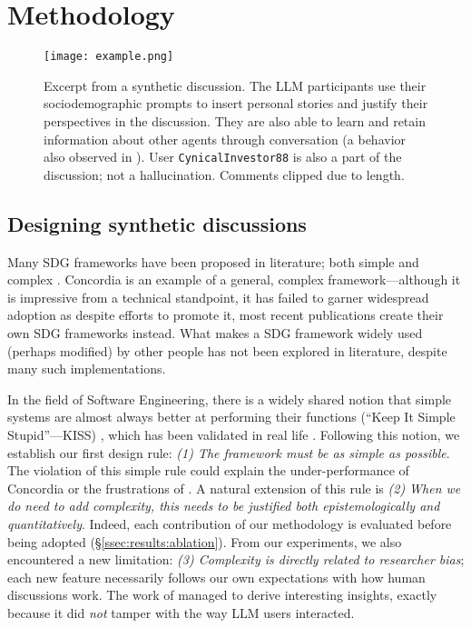 %

\section{Methodology}
\label{sec:methodology}

 \begin{figure*}[t]
	\centering
	\texttt{[image: example.png]}
	\caption{Excerpt from a synthetic discussion. The LLM participants use their sociodemographic prompts to insert personal stories and justify their perspectives in the discussion. They are also able to learn and retain information about other agents through conversation (a behavior also observed in \citet{park2023game}). User \texttt{CynicalInvestor88} is also a part of the discussion; not a hallucination. Comments clipped due to length.}
	\label{fig::example}
\end{figure*}


\subsection{Designing synthetic discussions}
\label{ssec:methodology:design}

Many SDG frameworks have been proposed in literature; both simple \citep{Tsai_Deliberate_Lab_Open-Source_2025, ulmer2024} and complex \citep{balog_2024, abdelnabi_negotiations, park2023game}. Concordia \citep{Vezhnevets2023GenerativeAM} is an example of a general, complex framework---although it is impressive from a technical standpoint, it has failed to garner widespread adoption as despite efforts to promote it, most recent publications create their own SDG frameworks instead. What makes a SDG framework widely used (perhaps modified) by other people has not been explored in literature, despite many such implementations.

In the field of Software Engineering, there is a widely shared notion that simple systems are almost always better at performing their functions (``Keep It Simple Stupid''---KISS) \citep{beck2000extreme, thomas2025simplicity}, which has been validated in real life \citep{banker1989software, ogheneovo2014relationship}. Following this notion, we establish our first design rule: \emph{(1) The framework must be as simple as possible}. The violation of this simple rule could explain the under-performance of Concordia or the frustrations of \citet{balog_2024}. A natural extension of this rule is \emph{(2) When we do need to add complexity, this needs to be justified both epistemologically and quantitatively}. Indeed, each contribution of our methodology is evaluated before being adopted (\S\ref{ssec:results:ablation}). From our experiments, we also encountered a new limitation: \emph{(3) Complexity is directly related to researcher bias}; each new feature necessarily follows our own expectations with how human discussions work. The work of \citet{park2023game} managed to derive interesting insights, exactly because it did \emph{not} tamper with the way LLM users interacted.

